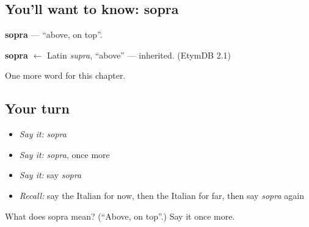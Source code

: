 \subsection*{You'll want to know: sopra}
\textbf{sopra} — \textquotedblleft{}above, on top\textquotedblright{}.

\begin{cousinweb}
\textbf{sopra} $\leftarrow$ Latin \emph{supra}, \textquotedblleft{}above\textquotedblright{} — inherited. (EtymDB 2.1)
\end{cousinweb}

\begin{grammarlens}[title={What you've built}]
One more word for this chapter.
\end{grammarlens}

\subsection*{Your turn}
\begin{itemize}
\raggedright
  \item \emph{Say it:} \emph{sopra}
  \item \emph{Say it:} \emph{sopra}, once more
  \item \emph{Say it:} say \emph{sopra}
  \item \emph{Recall:} say the Italian for now, then the Italian for far, then say \emph{sopra} again
\end{itemize}

\begin{tcolorbox}[breakable,colback=teal!4,colframe=teal!35!black,title={Before you move on}]
What does sopra mean? (\textquotedblleft{}Above, on top\textquotedblright{}.) Say it once more.
\end{tcolorbox}
